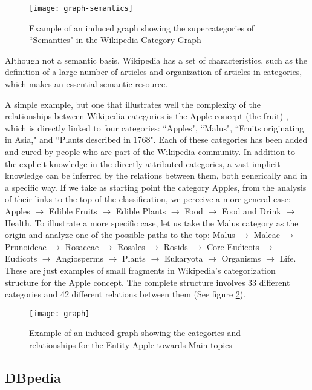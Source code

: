\begin{figure}[H]
\centering
  \texttt{[image: graph-semantics]}
  \caption{Example of an induced graph showing the supercategories of ``Semantics" in the Wikipedia Category Graph}
  \label{fig:semantics-category}
\end{figure}

Although not a semantic basis, Wikipedia has a set of characteristics, such as the definition of a large number of articles and organization of articles in categories, which makes an essential semantic resource.

A simple example, but one that illustrates well the complexity of the relationships between Wikipedia categories is the Apple concept (the fruit) , which is directly linked to four categories: ``Apples", ``Malus", ``Fruits originating in Asia," and ``Plants described in 1768". Each of these categories has been added and cured by people who are part of the Wikipedia community. In addition to the explicit knowledge in the directly attributed categories, a vast implicit knowledge can be inferred by the relations between them, both generically and in a specific way. If we take as starting point the category Apples, from the analysis of their links to the top of the classification, we perceive a more general case: Apples $\rightarrow$  Edible Fruits $\rightarrow$ Edible Plants $\rightarrow$ Food $\rightarrow$ Food and Drink $\rightarrow$ Health.
To illustrate a more specific case, let us take the Malus category as the origin and analyze one of the possible paths to the top: Malus $\rightarrow$ Maleae $\rightarrow$ Prunoideae $\rightarrow$ Rosaceae $\rightarrow$ Rosales $\rightarrow$ Rosids $\rightarrow$ Core Eudicots $\rightarrow$ Eudicots $\rightarrow$ Angiosperms $\rightarrow$ Plants $\rightarrow$ Eukaryota $\rightarrow$ Organisms $\rightarrow$ Life.
These are just examples of small fragments in Wikipedia's categorization structure for the Apple concept. The complete structure involves 33 different categories and 42 different relations between them (See figure \ref{fig:semantics-category-apple}).


\begin{figure}[H]
\centering
  \texttt{[image: graph]}
  \caption{Example of an induced graph showing the categories and relationships for the Entity Apple towards Main topics}
  \label{fig:semantics-category-apple}
\end{figure}


\subsection{\hspace*{3pt} DBpedia}


